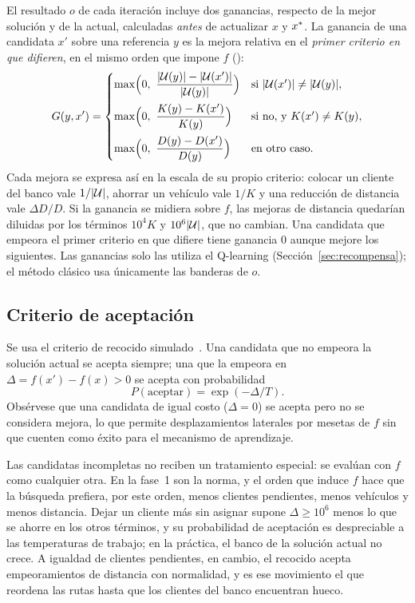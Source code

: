 El resultado $o$ de cada iteración incluye dos ganancias, respecto de la mejor solución y de
la actual, calculadas \emph{antes} de actualizar $x$ y $x^{*}$. La ganancia de una candidata
$x'$ sobre una referencia $y$ es la mejora relativa en el \emph{primer criterio en que
difieren}, en el mismo orden que impone $f$ ():
\begin{equation}
G(y,x')=
\begin{cases}
\max\Bigl(0,\ \dfrac{|\mathcal{U}(y)|-|\mathcal{U}(x')|}{|\mathcal{U}(y)|}\Bigr) & \text{si } |\mathcal{U}(x')|\neq|\mathcal{U}(y)|,\\[10pt]
\max\Bigl(0,\ \dfrac{K(y)-K(x')}{K(y)}\Bigr) & \text{si no, y } K(x')\neq K(y),\\[10pt]
\max\Bigl(0,\ \dfrac{D(y)-D(x')}{D(y)}\Bigr) & \text{en otro caso.}
\end{cases}
\label{eq:ganancia}
\end{equation}
Cada mejora se expresa así en la escala de su propio criterio: colocar un cliente del banco
vale $1/|\mathcal{U}|$, ahorrar un vehículo vale $1/K$ y una reducción de distancia vale
$\Delta D/D$. Si la ganancia se midiera sobre $f$, las mejoras de distancia quedarían diluidas
por los términos $10^{4}K$ y $10^{6}|\mathcal{U}|$, que no cambian. Una candidata que empeora el
primer criterio en que difiere tiene ganancia $0$ aunque mejore los siguientes. Las ganancias
solo las utiliza el Q-learning (Sección~\ref{sec:recompensa}); el método clásico usa
únicamente las banderas de $o$.

\subsection{Criterio de aceptación}
\label{sec:aceptacion}

Se usa el criterio de recocido simulado~\cite{kirkpatrick1983}. Una candidata que no empeora
la solución actual se acepta siempre; una que la empeora en $\Delta=f(x')-f(x)>0$ se acepta
con probabilidad
\begin{equation}
P(\text{aceptar})=\exp(-\Delta/T).
\label{eq:sa}
\end{equation}
Obsérvese que una candidata de igual costo ($\Delta=0$) se acepta pero no se considera mejora,
lo que permite desplazamientos laterales por mesetas de $f$ sin que cuenten como éxito para
el mecanismo de aprendizaje.

Las candidatas incompletas no reciben un tratamiento especial: se evalúan con $f$ como
cualquier otra. En la fase~1 son la norma, y el orden que induce $f$ hace que la búsqueda
prefiera, por este orden, menos clientes pendientes, menos vehículos y menos distancia. Dejar
un cliente más sin asignar supone $\Delta\ge 10^{6}$ menos lo que se ahorre en los otros
términos, y su probabilidad de aceptación es despreciable a las temperaturas de trabajo; en la
práctica, el banco de la solución actual no crece. A igualdad de clientes pendientes, en
cambio, el recocido acepta empeoramientos de distancia con normalidad, y es ese movimiento el
que reordena las rutas hasta que los clientes del banco encuentran hueco.

